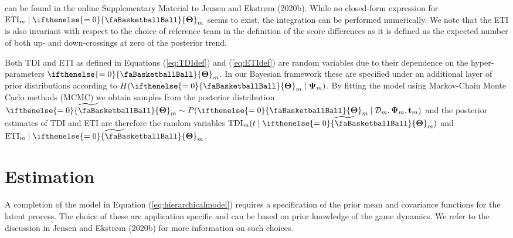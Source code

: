 \documentclass[
  11pt,
]{svjour3}
\theoremstyle{nonumberplain}
\begin{document}
can be found in the online Supplementary Material to Jensen and Ekstrøm
(2020b). While no closed-form expression for
\(\text{ETI}_m \mid \ifthenelse{\value{bbsym4theta}=0}{\text{\faBasketballBall}}{\mathbf{\Theta}}_m\)
seems to exist, the integration can be performed numerically. We note
that the ETI is also invariant with respect to the choice of reference
team in the definition of the score differences as it is defined as the
expected number of both up- and down-crossings at zero of the posterior
trend.

Both TDI and ETI as defined in Equations (\ref{eq:TDIdef}) and
(\ref{eq:ETIdef}) are random variables due to their dependence on the
hyper-parameters
\(\ifthenelse{\value{bbsym4theta}=0}{\text{\faBasketballBall}}{\mathbf{\Theta}}_m\).
In our Bayesian framework these are specified under an additional layer
of prior distributions according to
\(H(\ifthenelse{\value{bbsym4theta}=0}{\text{\faBasketballBall}}{\mathbf{\Theta}}_m \mid \bm{\Psi}_m)\).
By fitting the model using Markov-Chain Monte Carlo methods (MCMC) we
obtain samples from the posterior distribution
\(\widetilde{\ifthenelse{\value{bbsym4theta}=0}{\text{\faBasketballBall}}{\mathbf{\Theta}}}_m \sim P(\ifthenelse{\value{bbsym4theta}=0}{\text{\faBasketballBall}}{\mathbf{\Theta}}_m \mid \mathcal{D}_m, \bm{\Psi}_m, \mathbf{t}_m)\)
and the posterior estimates of TDI and ETI are therefore the random
variables
\(\textrm{TDI}_m(t \mid \widetilde{\ifthenelse{\value{bbsym4theta}=0}{\text{\faBasketballBall}}{\mathbf{\Theta}}}_m)\)
and
\(\textrm{ETI}_m \mid \widetilde{\ifthenelse{\value{bbsym4theta}=0}{\text{\faBasketballBall}}{\mathbf{\Theta}}}_m\).

\hypertarget{sec:estimation}{%
\section{Estimation}\label{sec:estimation}}

A completion of the model in Equation (\ref{eq:hierarchicalmodel})
requires a specification of the prior mean and covariance functions for
the latent process. The choice of these are application specific and can
be based on prior knowledge of the game dynamics. We refer to the
discussion in Jensen and Ekstrøm (2020b) for more information on such
choices.
\end{document}
